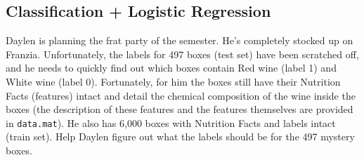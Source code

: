 \newpage


\subsection{Classification + Logistic Regression}

  Daylen is planning the frat party of the semester. He's completely stocked up
  on Franzia. Unfortunately, the labels for 497 boxes (test set) have been
  scratched off, and he needs to quickly find out which boxes contain Red wine
  (label 1) and White wine (label 0). Fortunately, for him the boxes still have
  their Nutrition Facts (features) intact and detail the chemical composition
  of the wine inside the boxes (the description of these features and the
  features themselves are provided in {\tt data.mat}). He also has 6,000 boxes
  with Nutrition Facts and labels intact (train set). Help Daylen figure out
  what the labels should be for the 497 mystery boxes.

